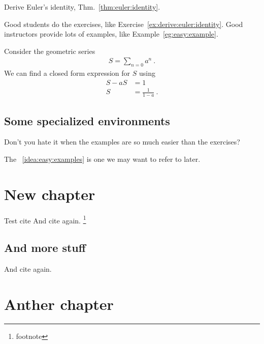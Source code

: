 \documentclass[12pt, oneside]{report}    %
\let\oldchapter\chapter
\def\chapter{%
  \setcounter{sidenote}{1}%
  \oldchapter
}
\begin{document}
\begin{exercise}
\label{ex:derive:euler:identity}
    Derive Euler's identity, Thm.~\ref{thm:euler:identity}.
\end{exercise}

\noindent Good students do the exercises, like Exercise~\ref{ex:derive:euler:identity}. Good instructors provide lots of examples, like Example~\ref{eg:easy:example}.

\begin{example}
\label{eg:easy:example}
    Consider the geometric series
    \begin{align}
        S = \sum_{n=0} a^n \ .
    \end{align}
    We can find a closed form expression for $S$ using
    \begin{align}
        S - aS &= 1\\
        S &= \frac{1}{1-a} \ .
    \end{align}
\end{example}

\section{Some specialized environments}

\begin{bigidea}
\label{idea:easy:examples}
Don't you hate it when the examples are so much easier than the exercises?
\end{bigidea}

\noindent The \bigidearef{}~\ref{idea:easy:examples} is one we may want to refer to later.

\chapter{New chapter}

Test cite\autocite{Feng:2016ijc}
\lipsum[1]
And cite again\autocite{Feng:2016ijc}.
 \lipsum[1]\footnote{footnote}

\section{And more stuff}
\lipsum[3]
And cite again\autocite{Feng:2016ijc}.


\chapter{Anther chapter}
\lipsum[3]\autocite{Feng:2016ijc}
\end{document}
